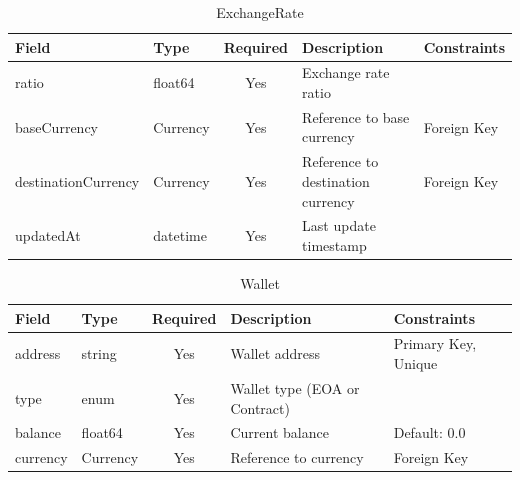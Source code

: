 \begin{table}[htbp]
  \centering
  \caption{ExchangeRate}
  \renewcommand{\arraystretch}{1.5}
  \begin{tabular}{|p{3cm}|p{2cm}|c|p{4cm}|p{4cm}|}
    \hline
    \textbf{Field} & \textbf{Type} & \textbf{Required} & \textbf{Description} & \textbf{Constraints} \\
    \hline
    ratio & float64 & Yes & Exchange rate ratio & \\
    \hline
    baseCurrency & Currency & Yes & Reference to base currency & Foreign Key \\
    \hline
    destinationCurrency & Currency & Yes & Reference to destination currency & Foreign Key \\
    \hline
    updatedAt & datetime & Yes & Last update timestamp & \\
    \hline
  \end{tabular}
\end{table}

\begin{table}[htbp]
  \centering
  \caption{Wallet}
  \renewcommand{\arraystretch}{1.5}
  \begin{tabular}{|p{3cm}|p{2cm}|c|p{4cm}|p{4cm}|}
    \hline
    \textbf{Field} & \textbf{Type} & \textbf{Required} & \textbf{Description} & \textbf{Constraints} \\
    \hline
    address & string & Yes & Wallet address & Primary Key, Unique \\
    \hline
    type & enum & Yes & Wallet type (EOA or Contract) & \\
    \hline
    balance & float64 & Yes & Current balance & Default: 0.0 \\
    \hline
    currency & Currency & Yes & Reference to currency & Foreign Key \\
    \hline
  \end{tabular}
\end{table}

